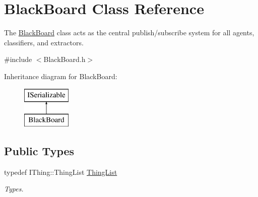 \hypertarget{class_black_board}{}\section{Black\+Board Class Reference}
\label{class_black_board}


The \hyperlink{class_black_board}{Black\+Board} class acts as the central publish/subscribe system for all agents, classifiers, and extractors.  




{\ttfamily \#include $<$Black\+Board.\+h$>$}

Inheritance diagram for Black\+Board\+:\begin{figure}[H]
\begin{center}
\leavevmode
\includegraphics[height=2.000000cm]{class_black_board}
\end{center}
\end{figure}
\subsection*{Public Types}
\begin{DoxyCompactItemize}
\item 
\mbox{\label{class_black_board_a34c71e0cce3bbfd34bd9fd91607b01c0}} 
typedef I\+Thing\+::\+Thing\+List \hyperlink{class_black_board_a34c71e0cce3bbfd34bd9fd91607b01c0}{Thing\+List}
\begin{DoxyCompactList}\small\item\em Types. \end{DoxyCompactList}\end{DoxyCompactItemize}
